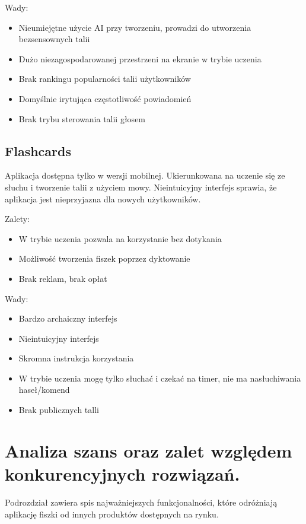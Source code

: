 Wady:
\begin{itemize}[label=-]
    \item Nieumiejętne użycie AI przy tworzeniu, prowadzi do utworzenia bezsensownych talii
    \item Dużo niezagospodarowanej przestrzeni na ekranie w trybie uczenia
    \item Brak rankingu popularności talii użytkowników
    \item Domyślnie irytująca częstotliwość powiadomień
    \item Brak trybu sterowania talii głosem
    \end{itemize}

\subsection{Flashcards}

Aplikacja dostępna tylko w wersji mobilnej. Ukierunkowana na uczenie się ze słuchu i tworzenie talii z użyciem mowy. Nieintuicyjny interfejs sprawia, że aplikacja jest nieprzyjazna dla nowych użytkowników.

Zalety:
\begin{itemize}[label=-]
    \item W trybie uczenia pozwala na korzystanie bez dotykania
    \item Możliwość tworzenia fiszek poprzez dyktowanie
    \item Brak reklam, brak opłat
    \end{itemize}

Wady:
\begin{itemize}[label=-]
    \item Bardzo archaiczny interfejs
    \item Nieintuicyjny interfejs
    \item Skromna instrukcja korzystania
    \item W trybie uczenia mogę tylko słuchać i czekać na timer, nie ma nasłuchiwania haseł/komend
    \item Brak publicznych talli
    \end{itemize}

\section{Analiza szans oraz zalet względem konkurencyjnych rozwiązań.}

Podrozdział zawiera spis najważniejszych funkcjonalności, które odróżniają aplikację fiszki od innych produktów dostępnych na rynku.

